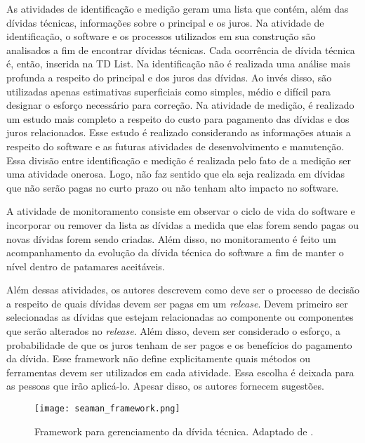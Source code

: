 As atividades de identificação e medição geram uma lista que contém, além das dívidas técnicas, informações sobre o principal e os juros. Na atividade de identificação, o software e os processos utilizados em sua construção são analisados a fim de encontrar dívidas técnicas. Cada ocorrência de dívida técnica é, então, inserida na TD List. Na identificação não é realizada uma análise mais profunda a respeito do principal e dos juros das dívidas. Ao invés disso, são utilizadas apenas estimativas superficiais como  simples, médio e difícil para designar o esforço necessário para correção. Na atividade de medição, é realizado um estudo mais completo a respeito do custo para pagamento das dívidas e dos juros relacionados. Esse estudo é realizado considerando as informações atuais a respeito do software e as futuras atividades de desenvolvimento e manutenção. Essa divisão entre identificação e medição é realizada pelo fato de a medição ser uma atividade onerosa. Logo, não faz sentido que ela seja realizada em dívidas que não serão pagas no curto prazo ou não tenham alto impacto no software. 

A atividade de monitoramento consiste em observar o ciclo de vida do software e incorporar ou remover da lista as dívidas a medida que elas forem sendo pagas ou novas dívidas forem sendo criadas.  Além disso, no monitoramento é feito um acompanhamento da evolução da dívida técnica do software a fim de manter o nível dentro de patamares aceitáveis.

 Além dessas atividades, os autores descrevem como deve ser o processo de decisão a respeito de quais dívidas devem ser pagas em um \textit{release}. Devem primeiro ser selecionadas as dívidas que estejam relacionadas ao componente ou componentes que serão alterados no \textit{release}. Além disso, devem ser considerado o esforço, a probabilidade de que os juros tenham de ser pagos e os benefícios do pagamento da dívida. Esse framework não define explicitamente quais métodos ou ferramentas devem ser utilizados em cada atividade. Essa escolha é deixada para as pessoas que irão aplicá-lo. Apesar disso, os autores fornecem sugestões.


\begin{figure}[!h]
  \centering
  \texttt{[image: seaman\_framework.png]} 
  \caption{Framework para gerenciamento da dívida técnica. Adaptado de \cite{seaman2011measuring}.  }
  \label{fig:seaman_framework} 
\end{figure}


